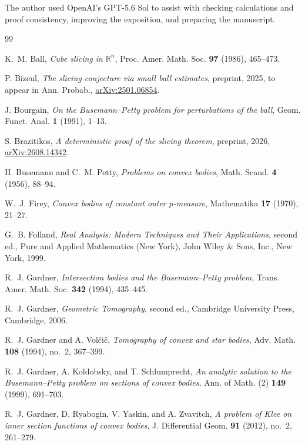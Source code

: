 \documentclass[11pt]{article}
\theoremstyle{remark}
\newcommand{\R}{\mathbb{R}}
\begin{document}
The author used OpenAI's GPT-5.6 Sol to assist with checking
calculations and proof consistency, improving the exposition, and preparing
the manuscript.



\begin{thebibliography}{99}

K.~M. Ball,
\emph{Cube slicing in $\R^n$},
Proc. Amer. Math. Soc. \textbf{97} (1986), 465--473.

P. Bizeul,
\emph{The slicing conjecture via small ball estimates},
preprint, 2025, to appear in Ann. Probab.,
\href{https://arxiv.org/abs/2501.06854}{arXiv:2501.06854}.

J. Bourgain,
\emph{On the Busemann--Petty problem for perturbations of the ball},
Geom. Funct. Anal. \textbf{1} (1991), 1--13.

S. Brazitikos,
\emph{A deterministic proof of the slicing theorem},
preprint, 2026,
\href{https://arxiv.org/abs/2608.14342}{arXiv:2608.14342}.

H. Busemann and C.~M. Petty,
\emph{Problems on convex bodies},
Math. Scand. \textbf{4} (1956), 88--94.

W.~J. Firey,
\emph{Convex bodies of constant outer $p$-measure},
Mathematika \textbf{17} (1970), 21--27.

G.~B. Folland,
\emph{Real Analysis: Modern Techniques and Their Applications}, second ed.,
Pure and Applied Mathematics (New York),
John Wiley \& Sons, Inc., New York, 1999.

R.~J. Gardner,
\emph{Intersection bodies and the Busemann--Petty problem},
Trans. Amer. Math. Soc. \textbf{342} (1994), 435--445.

R.~J. Gardner,
\emph{Geometric Tomography}, second ed.,
Cambridge University Press, Cambridge, 2006.

R.~J. Gardner and A. Vol\v{c}i\v{c},
\emph{Tomography of convex and star bodies},
Adv. Math. \textbf{108} (1994), no.~2, 367--399.

R.~J. Gardner, A. Koldobsky, and T. Schlumprecht,
\emph{An analytic solution to the Busemann--Petty problem on sections of
convex bodies},
Ann. of Math. (2) \textbf{149} (1999), 691--703.

R.~J. Gardner, D. Ryabogin, V. Yaskin, and A. Zvavitch,
\emph{A problem of Klee on inner section functions of convex bodies},
J. Differential Geom. \textbf{91} (2012), no.~2, 261--279.


\end{thebibliography}
\end{document}
